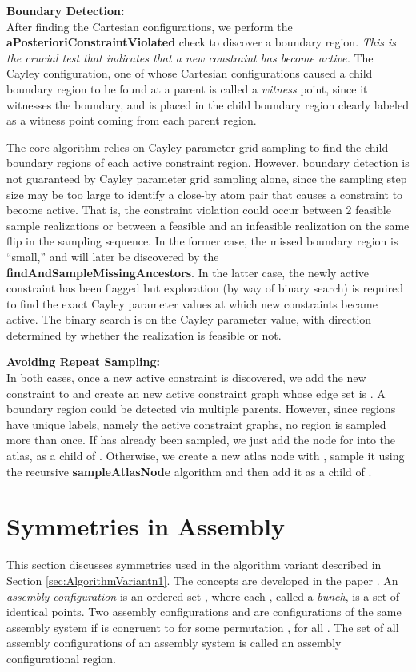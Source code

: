 \documentclass[]{article}
\begin{document}
\noindent\textbf{Boundary Detection:\\}
After finding the Cartesian configurations, we perform the
\textbf{aPosterioriConstraintViolated} check to discover a boundary region.
{\sl This is the crucial test that indicates that a new constraint has become
active.} The Cayley configuration, one of whose Cartesian configurations caused a child boundary region to
be found at a parent is called a \emph{witness} point, since it witnesses the
boundary, and is placed in the child boundary region clearly labeled as a
witness point coming from each parent region. 

The core algorithm relies on Cayley parameter grid sampling to find the child boundary
regions of each active constraint region. However, boundary detection is not
guaranteed by Cayley parameter grid sampling alone, since the sampling step
size may be too large to identify a close-by atom pair that causes a 
constraint to become active. That is, the constraint violation could occur between 2
feasible sample realizations or between a feasible and an infeasible
realization on the same flip in the sampling sequence. In the former case, the
missed boundary region is ``small,'' and will later be discovered by
the {\bf findAndSampleMissingAncestors}. In the latter case, the newly active
constraint has been flagged but exploration (by way of binary search) is
required to find the exact Cayley parameter values at which new constraints
became active. The binary search is on the Cayley parameter value, with
direction determined by whether the realization is feasible or not.

\noindent \textbf{Avoiding Repeat Sampling:\\}
In both cases, once a new active constraint  is discovered, we add the new
constraint to  and create an new active constraint graph  whose 
edge set is . A boundary region could be detected via multiple parents.
However, since regions have unique labels, namely the active constraint graphs,
no region is sampled more than once. If  has already been sampled, we just
add the node for  into the atlas, as a child of . Otherwise, we create
a new atlas node with , sample it using the recursive
\textbf{sampleAtlasNode} algorithm and then add it as a child of .  


\section{Symmetries in Assembly}
\label{sec:app:symmetries}
This section discusses symmetries used in the algorithm variant
described in Section \ref{sec:AlgorithmVariantn1}.
The concepts are developed in the paper \cite{sym8010005}.
An \emph{assembly configuration} is an ordered set , where each , called a \emph{bunch}, is a set of  identical
points. Two assembly configurations  and  are
configurations of the same assembly system if  is congruent to
 for some permutation , for all .  The set
of all assembly configurations of an assembly system is called an assembly
configurational region.
\end{document}
